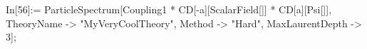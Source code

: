 In[56]:= ParticleSpectrum[Coupling1 * CD[-a][ScalarField[]] * CD[a][Psi[]], TheoryName -> "MyVeryCoolTheory", Method -> "Hard", MaxLaurentDepth -> 3]; 